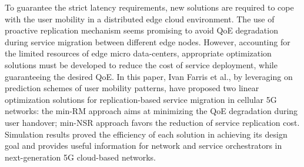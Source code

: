 \cite{farris2017optimizing}
To guarantee the strict latency requirements, new solutions are required to cope with the user mobility in a distributed edge cloud environment. The use of proactive replication mechanism seems promising to avoid QoE degradation during service migration between different edge nodes. However, accounting for the limited resources of edge micro data-centers, appropriate optimization solutions must be developed to reduce the cost of service deployment, while guaranteeing the desired QoE. In this paper, Ivan Farris et al., by leveraging on prediction schemes of user mobility patterns, have proposed two linear optimization solutions for replication-based service migration in cellular 5G networks: the min-RM approach aims at minimizing the QoE degradation during user handover; min-NSR approach favors the reduction of service replication cost. Simulation results proved the efficiency of each solution in achieving its design goal and provides useful information for network and service orchestrators in next-generation 5G cloud-based networks.


